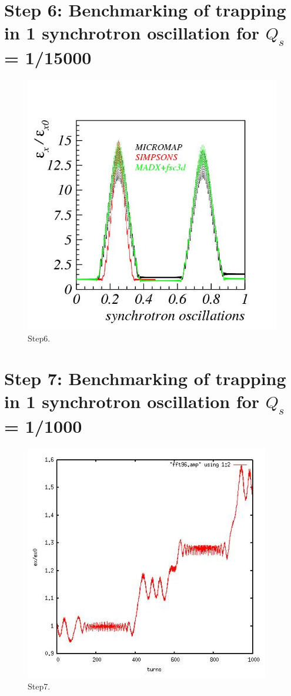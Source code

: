 \documentclass[a4paper]{cernatsnote}
\begin{document}
\section{Step 6: Benchmarking of trapping in 1 synchrotron oscillation for $Q_s$ = 1/15000}

\begin{figure}[!htb]
        \centering
        \includegraphics[width=0.5\columnwidth]{Step6_trapping.jpg}
        \caption{Step6.}
        \label{fig:step6}
\end{figure}

\section{Step 7: Benchmarking of trapping in 1 synchrotron oscillation for $Q_s$ = 1/1000}

\begin{figure}[!htb]
        \centering
        \includegraphics[width=0.5\columnwidth]{Step7_trapping_MICROMAP.jpg}
        \caption{Step7.}
        \label{fig:step7_m}
\end{figure}
\end{document}
